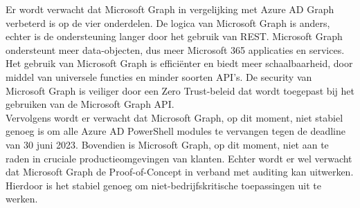 \begin{comment}

Hier beschrijf je welke resultaten je verwacht. Als je metingen en simulaties uitvoert, kan je hier al mock-ups maken van de grafieken samen met de verwachte conclusies. Benoem zeker al je assen en de onderdelen van de grafiek die je gaat gebruiken. Dit zorgt ervoor dat je concreet weet welk soort data je moet verzamelen en hoe je die moet meten.

Wat heeft de doelgroep van je onderzoek aan het resultaat? Op welke manier zorgt jouw bachelorproef voor een meerwaarde?

Hier beschrijf je wat je verwacht uit je onderzoek, met de motivatie waarom. Het is \textbf{niet} erg indien uit je onderzoek andere resultaten en conclusies vloeien dan dat je hier beschrijft: het is dan juist interessant om te onderzoeken waarom jouw hypothesen niet overeenkomen met de resultaten.

\end{comment}

Er wordt verwacht dat Microsoft Graph in vergelijking met Azure AD Graph verbeterd is op de vier onderdelen. De logica van Microsoft Graph is anders, echter is de ondersteuning langer door het gebruik van REST. Microsoft Graph ondersteunt meer data-objecten, dus meer Microsoft 365 applicaties en services. Het gebruik van Microsoft Graph is efficiënter en biedt meer schaalbaarheid, door middel van universele functies en minder soorten API’s. De security van Microsoft Graph is veiliger door een Zero Trust-beleid dat wordt toegepast bij het gebruiken van de Microsoft Graph API. \\

Vervolgens wordt er verwacht dat Microsoft Graph, op dit moment, niet stabiel genoeg is om alle Azure AD PowerShell modules te vervangen tegen de deadline van 30 juni 2023. Bovendien is Microsoft Graph, op dit moment, niet aan te raden in cruciale productieomgevingen van klanten. Echter wordt er wel verwacht dat Microsoft Graph de Proof-of-Concept in verband met auditing kan uitwerken. Hierdoor is het stabiel genoeg om niet-bedrijfskritische toepassingen uit te werken.
